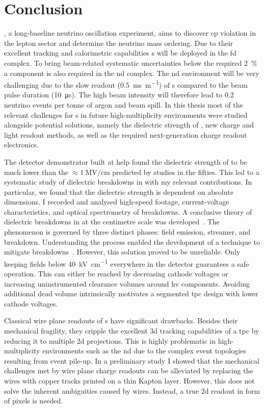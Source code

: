 \chapter{Conclusion}
\label{chap:conclusion}

\dune{}, a long-baseline neutrino oscillation experiment, aims to discover \gls{cp} violation in the lepton sector and determine the neutrino mass ordering.
Due to their excellent tracking and calorimetric capabilities \lartpc{}s will be deployed in the \gls{fd} complex.
To bring beam-related systematic uncertainties below the required \SI{2}{\percent} a \lartpc{} component is also required in the \gls{nd} complex.
The \gls{nd} environment will be very challenging due to the slow readout (\SI{0.5}{\milli\second\per\metre}) of \lartpc{}s compared to the beam pulse duration (\SI{10}{\micro\second}).
The high beam intensity will therefore lead to \num{0.2} neutrino events per tonne of argon and beam spill.
In this thesis most of the relevant challenges for \lartpc{}s in future high-multiplicity environments were studied alongside potential solutions, namely the dielectric strength of \lar{}, new charge and light readout methods, as well as the required next-generation charge readout electronics.

The \AT{} detector demonstrator built at \gls{help} found the dielectric strength of \lar{} to be much lower than the $\approx \SI{1}{\mega\volt\per\centi\metre}$ predicted by studies in the fifties.
This led to a systematic study of dielectric breakdowns in \lar{} with my relevant contributions.
In particular, we found that the dielectric strength is dependent on absolute dimensions.
I recorded and analysed high-speed footage, current-voltage characteristics, and optical spectrometry of breakdowns.
A conclusive theory of dielectric breakdowns in \lar{} at the centimetre scale was developed~\cite{breakdown_16}.
The phenomenon is governed by three distinct phases: field emission, streamer, and breakdown.
Understanding the process enabled the development of a technique to mitigate breakdowns~\cite{latex}.
However, this solution proved to be unreliable.
Only keeping fields below \SI{40}{\kilo\volt\per\centi\metre} everywhere in the detector guarantees a safe operation.
This can either be reached by decreasing cathode voltages or increasing uninstrumented clearance volumes around \gls{hv} components.
Avoiding additional dead \lar{} volume intrinsically motivates a segmented \gls{tpc} design with lower cathode voltages.

Classical wire plane readouts of \lartpc{}s have significant drawbacks.
Besides their mechanical fragility, they cripple the excellent \gls{3d} tracking capabilities of a \gls{tpc} by reducing it to multiple \gls{2d} projections.
This is highly problematic in high-multiplicity environments such as the \dune{} \gls{nd} due to the complex event topologies resulting from event pile-up.
In a preliminary study I showed that the mechanical challenges met by wire plane charge readouts can be alleviated by replacing the wires with copper tracks printed on a thin Kapton layer.
However, this does not solve the inherent ambiguities caused by wires.
Instead, a true \gls{2d} readout in form of pixels is needed.

